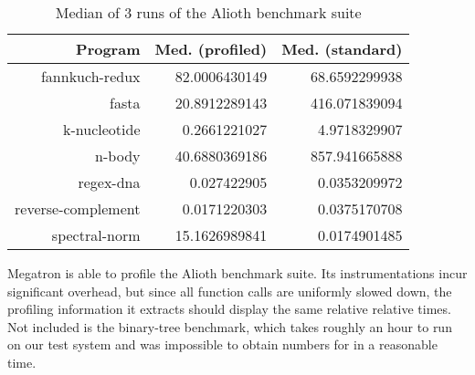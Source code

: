 \documentclass{article}
\begin{document}
\begin{table}[t!]
\centering
\small
\newcommand{\siqr}[1]{\scriptsize(#1)}
\begin{tabular}{|r|r|r|}
\hline
\textbf{Program} & \textbf{Med.} (profiled) & \textbf{Med.} (standard) \\
\hline
fannkuch-redux & 82.0006430149 & 68.6592299938 \\
fasta & 20.8912289143 & 416.071839094 \\
k-nucleotide & 0.2661221027 & 4.9718329907 \\
n-body & 40.6880369186 & 857.941665888 \\
regex-dna & 0.027422905 & 0.0353209972 \\
reverse-complement & 0.0171220303 & 0.0375170708 \\
spectral-norm & 15.1626989841 & 0.0174901485 \\
\hline
\end{tabular}
\caption{Median of 3 runs of the Alioth benchmark suite}
\label{tab:alioth}
\end{table}


Megatron is able to profile the Alioth benchmark suite. Its instrumentations incur significant overhead, but since all function calls are uniformly slowed down, the profiling information it extracts should display the same relative relative times. Not included is the binary-tree benchmark, which takes roughly an hour to run on our test system and was impossible to obtain numbers for in a reasonable time. 
\end{document}
